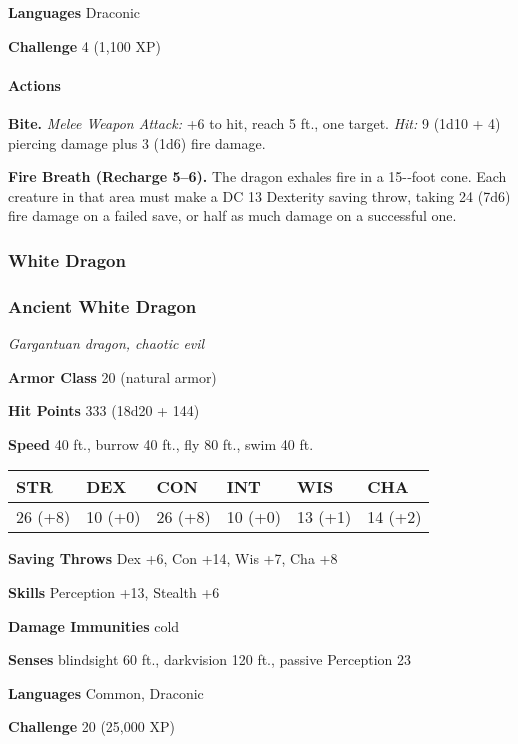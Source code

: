 \documentclass[
]{article}
\begin{document}
\textbf{Languages} Draconic

\textbf{Challenge} 4 (1,100 XP)

\hypertarget{actions-38}{%
\paragraph{Actions}\label{actions-38}}

\textbf{Bite.} \emph{Melee Weapon Attack:} +6 to hit, reach 5 ft., one
target. \emph{Hit:} 9 (1d10 + 4) piercing damage plus 3 (1d6) fire
damage.

\textbf{Fire Breath (Recharge 5--6).} The dragon exhales fire in a
15-­‐foot cone. Each creature in that area must make a DC 13 Dexterity
saving throw, taking 24 (7d6) fire damage on a failed save, or half as
much damage on a successful one.

\hypertarget{white-dragon}{%
\subsubsection{White Dragon}\label{white-dragon}}

\hypertarget{ancient-white-dragon}{%
\subsubsection{Ancient White Dragon}\label{ancient-white-dragon}}

\emph{Gargantuan dragon, chaotic evil}

\textbf{Armor Class} 20 (natural armor)

\textbf{Hit Points} 333 (18d20 + 144)

\textbf{Speed} 40 ft., burrow 40 ft., fly 80 ft., swim 40 ft.

\begin{longtable}[]{@{}llllll@{}}
\toprule
STR & DEX & CON & INT & WIS & CHA\tabularnewline
\midrule
\endhead
26 (+8) & 10 (+0) & 26 (+8) & 10 (+0) & 13 (+1) & 14 (+2)\tabularnewline
\bottomrule
\end{longtable}

\textbf{Saving Throws} Dex +6, Con +14, Wis +7, Cha +8

\textbf{Skills} Perception +13, Stealth +6

\textbf{Damage Immunities} cold

\textbf{Senses} blindsight 60 ft., darkvision 120 ft., passive
Perception 23

\textbf{Languages} Common, Draconic

\textbf{Challenge} 20 (25,000 XP)
\end{document}
